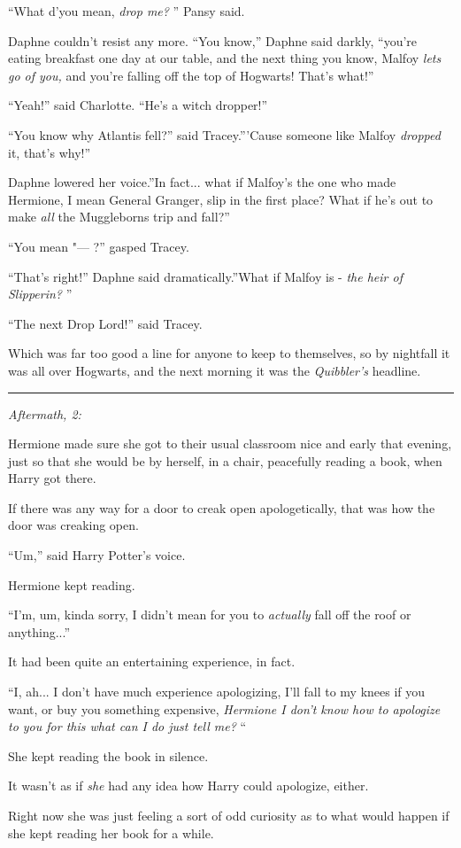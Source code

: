 ``What d'you mean, \emph{drop me?} '' Pansy said.

Daphne couldn't resist any more. ``You know,'' Daphne said darkly,
``you're eating breakfast one day at our table, and the next thing you
know, Malfoy \emph{lets go of you,} and you're falling off the top of
Hogwarts! That's what!''

``Yeah!'' said Charlotte. ``He's a witch dropper!''

``You know why Atlantis fell?'' said Tracey.'''Cause someone like Malfoy
\emph{dropped} it, that's why!''

Daphne lowered her voice.''In fact... what if Malfoy's the one who
made Hermione, I mean General Granger, slip in the first place? What if
he's out to make \emph{all} the Muggleborns trip and fall?''

``You mean "--- ?'' gasped Tracey.

``That's right!'' Daphne said dramatically.''What if Malfoy is -
\emph{the heir of Slipperin?} ''

``The next Drop Lord!'' said Tracey.

Which was far too good a line for anyone to keep to themselves, so by
nightfall it was all over Hogwarts, and the next morning it was the
\emph{Quibbler's} headline.

\begin{center}\rule{3in}{0.4pt}\end{center}

\emph{Aftermath, 2:}

Hermione made sure she got to their usual classroom nice and early that
evening, just so that she would be by herself, in a chair, peacefully
reading a book, when Harry got there.

If there was any way for a door to creak open apologetically, that was
how the door was creaking open.

``Um,'' said Harry Potter's voice.

Hermione kept reading.

``I'm, um, kinda sorry, I didn't mean for you to \emph{actually} fall off
the roof or anything...''

It had been quite an entertaining experience, in fact.

``I, ah... I don't have much experience apologizing, I'll fall to my
knees if you want, or buy you something expensive, \emph{Hermione I
don't know how to apologize to you for this what can I do just tell me?}
``

She kept reading the book in silence.

It wasn't as if \emph{she} had any idea how Harry could apologize,
either.

Right now she was just feeling a sort of odd curiosity as to what would
happen if she kept reading her book for a while.
